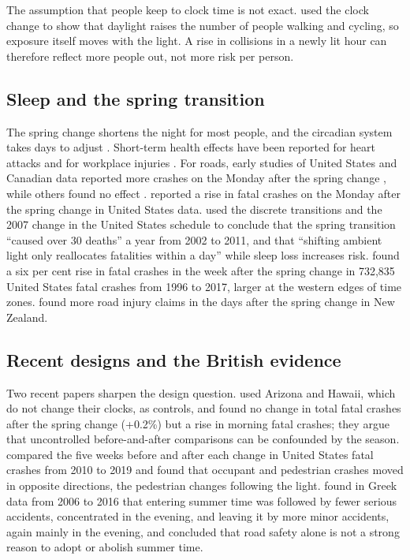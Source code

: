 \documentclass[11pt,a4paper]{article}
\begin{document}
The assumption that people keep to clock time is not exact. \citet{uttley2017jep} used the clock change to show that daylight raises the number of people walking and cycling, so exposure itself moves with the light. A rise in collisions in a newly lit hour can therefore reflect more people out, not more risk per person.

\subsection{Sleep and the spring transition}
The spring change shortens the night for most people, and the circadian system takes days to adjust \citep{kantermann2007,harrison2013}. Short-term health effects have been reported for heart attacks \citep{janszky2008} and for workplace injuries \citep{barnes2009}. For roads, early studies of United States and Canadian data reported more crashes on the Monday after the spring change \citep{coren1996,hicks1983}, while others found no effect \citep{lambe2000,lahti2010}. \citet{varughese2001} reported a rise in fatal crashes on the Monday after the spring change in United States data. \citet{smith2016} used the discrete transitions and the 2007 change in the United States schedule to conclude that the spring transition ``caused over 30 deaths'' a year from 2002 to 2011, and that ``shifting ambient light only reallocates fatalities within a day'' while sleep loss increases risk. \citet{fritz2020} found a six per cent rise in fatal crashes in the week after the spring change in 732,835 United States fatal crashes from 1996 to 2017, larger at the western edges of time zones. \citet{robb2018} found more road injury claims in the days after the spring change in New Zealand.

\subsection{Recent designs and the British evidence}
Two recent papers sharpen the design question. \citet{lei2026} used Arizona and Hawaii, which do not change their clocks, as controls, and found no change in total fatal crashes after the spring change (+0.2\%) but a rise in morning fatal crashes; they argue that uncontrolled before-and-after comparisons can be confounded by the season. \citet{woods2025} compared the five weeks before and after each change in United States fatal crashes from 2010 to 2019 and found that occupant and pedestrian crashes moved in opposite directions, the pedestrian changes following the light. \citet{laliotis2023} found in Greek data from 2006 to 2016 that entering summer time was followed by fewer serious accidents, concentrated in the evening, and leaving it by more minor accidents, again mainly in the evening, and concluded that road safety alone is not a strong reason to adopt or abolish summer time.
\end{document}
